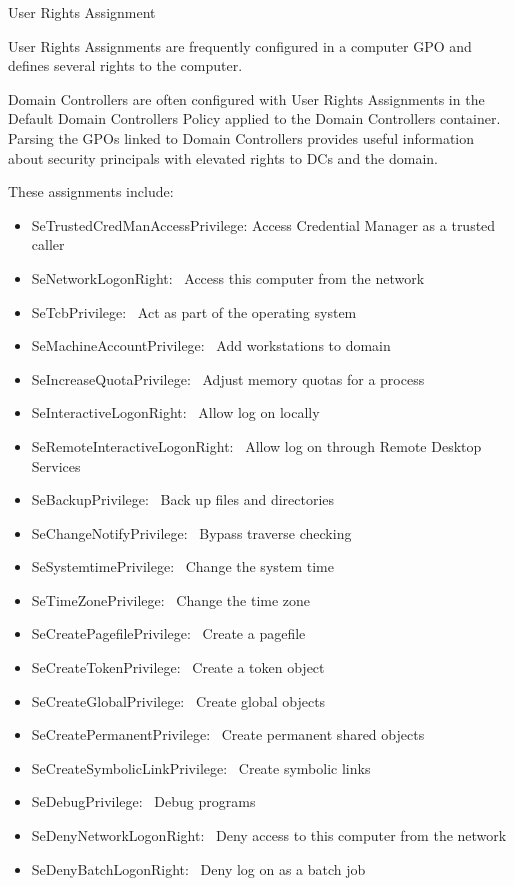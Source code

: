 User Rights Assignment

User Rights Assignments are frequently configured in a computer GPO and defines several rights to the computer.

Domain Controllers are often configured with User Rights Assignments in the Default Domain Controllers Policy applied to the Domain Controllers container. Parsing the GPOs linked to Domain Controllers provides useful information about security principals with elevated rights to DCs and the domain.

These assignments include:

\begin{itemize}
    \item SeTrustedCredManAccessPrivilege: Access Credential Manager as a trusted caller
    \item SeNetworkLogonRight:  Access this computer from the network
    \item SeTcbPrivilege:  Act as part of the operating system
    \item SeMachineAccountPrivilege:  Add workstations to domain
    \item SeIncreaseQuotaPrivilege:  Adjust memory quotas for a process
    \item SeInteractiveLogonRight:  Allow log on locally
    \item SeRemoteInteractiveLogonRight:  Allow log on through Remote Desktop Services
    \item SeBackupPrivilege:  Back up files and directories
    \item SeChangeNotifyPrivilege:  Bypass traverse checking
    \item SeSystemtimePrivilege:  Change the system time
    \item SeTimeZonePrivilege:  Change the time zone
    \item SeCreatePagefilePrivilege:  Create a pagefile
    \item SeCreateTokenPrivilege:  Create a token object
    \item SeCreateGlobalPrivilege:  Create global objects
    \item SeCreatePermanentPrivilege:  Create permanent shared objects
    \item SeCreateSymbolicLinkPrivilege:  Create symbolic links
    \item SeDebugPrivilege:  Debug programs
    \item SeDenyNetworkLogonRight:  Deny access to this computer from the network
    \item SeDenyBatchLogonRight:  Deny log on as a batch job

\end{itemize}
